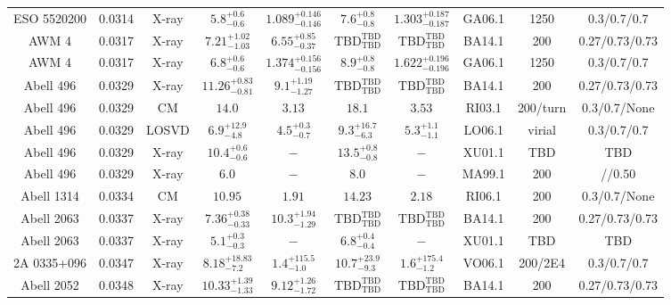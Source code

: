 \begin{table}
\begin{tabular}{cccccccccc}
ESO 5520200 & 0.0314 & X-ray & ${5.8}^{+0.6}_{-0.6}$ & ${1.089}^{+0.146}_{-0.146}$ & ${7.6}^{+0.8}_{-0.8}$ & ${1.303}^{+0.187}_{-0.187}$ & GA06.1 & 1250 & 0.3/0.7/0.7 \\
AWM 4 & 0.0317 & X-ray & ${7.21}^{+1.02}_{-1.03}$ & ${6.55}^{+0.85}_{-0.37}$ & ${\mathrm{TBD}}^{\mathrm{TBD}}_{\mathrm{TBD}}$ & ${\mathrm{TBD}}^{\mathrm{TBD}}_{\mathrm{TBD}}$ & BA14.1 & 200 & 0.27/0.73/0.73 \\
AWM 4 & 0.0317 & X-ray & ${6.8}^{+0.6}_{-0.6}$ & ${1.374}^{+0.156}_{-0.156}$ & ${8.9}^{+0.8}_{-0.8}$ & ${1.622}^{+0.196}_{-0.196}$ & GA06.1 & 1250 & 0.3/0.7/0.7 \\
Abell 496 & 0.0329 & X-ray & ${11.26}^{+0.83}_{-0.81}$ & ${9.1}^{+1.19}_{-1.27}$ & ${\mathrm{TBD}}^{\mathrm{TBD}}_{\mathrm{TBD}}$ & ${\mathrm{TBD}}^{\mathrm{TBD}}_{\mathrm{TBD}}$ & BA14.1 & 200 & 0.27/0.73/0.73 \\
Abell 496 & 0.0329 & CM & ${14.0}^{}_{}$ & ${3.13}^{}_{}$ & ${18.1}^{}_{}$ & ${3.53}^{}_{}$ & RI03.1 & 200/turn & 0.3/0.7/None \\
Abell 496 & 0.0329 & LOSVD & ${6.9}^{+12.9}_{-4.8}$ & ${4.5}^{+0.3}_{-0.7}$ & ${9.3}^{+16.7}_{-6.3}$ & ${5.3}^{+1.1}_{-1.1}$ & LO06.1 & virial & 0.3/0.7/0.7 \\
Abell 496 & 0.0329 & X-ray & ${10.4}^{+0.6}_{-0.6}$ & ${-}^{}_{}$ & ${13.5}^{+0.8}_{-0.8}$ & ${-}^{}_{}$ & XU01.1 & TBD & TBD \\
Abell 496 & 0.0329 & X-ray & ${6.0}^{}_{}$ & ${-}^{}_{}$ & ${8.0}^{}_{}$ & ${-}^{}_{}$ & MA99.1 & 200 & //0.50 \\
Abell 1314 & 0.0334 & CM & ${10.95}^{}_{}$ & ${1.91}^{}_{}$ & ${14.23}^{}_{}$ & ${2.18}^{}_{}$ & RI06.1 & 200 & 0.3/0.7/None \\
Abell 2063 & 0.0337 & X-ray & ${7.36}^{+0.38}_{-0.33}$ & ${10.3}^{+1.94}_{-1.29}$ & ${\mathrm{TBD}}^{\mathrm{TBD}}_{\mathrm{TBD}}$ & ${\mathrm{TBD}}^{\mathrm{TBD}}_{\mathrm{TBD}}$ & BA14.1 & 200 & 0.27/0.73/0.73 \\
Abell 2063 & 0.0337 & X-ray & ${5.1}^{+0.3}_{-0.3}$ & ${-}^{}_{}$ & ${6.8}^{+0.4}_{-0.4}$ & ${-}^{}_{}$ & XU01.1 & TBD & TBD \\
2A 0335+096 & 0.0347 & X-ray & ${8.18}^{+18.83}_{-7.2}$ & ${1.4}^{+115.5}_{-1.0}$ & ${10.7}^{+23.9}_{-9.3}$ & ${1.6}^{+175.4}_{-1.2}$ & VO06.1 & 200/2E4 & 0.3/0.7/0.7 \\
Abell 2052 & 0.0348 & X-ray & ${10.33}^{+1.39}_{-1.33}$ & ${9.12}^{+1.26}_{-1.72}$ & ${\mathrm{TBD}}^{\mathrm{TBD}}_{\mathrm{TBD}}$ & ${\mathrm{TBD}}^{\mathrm{TBD}}_{\mathrm{TBD}}$ & BA14.1 & 200 & 0.27/0.73/0.73 \\

\end{tabular}
\end{table}
